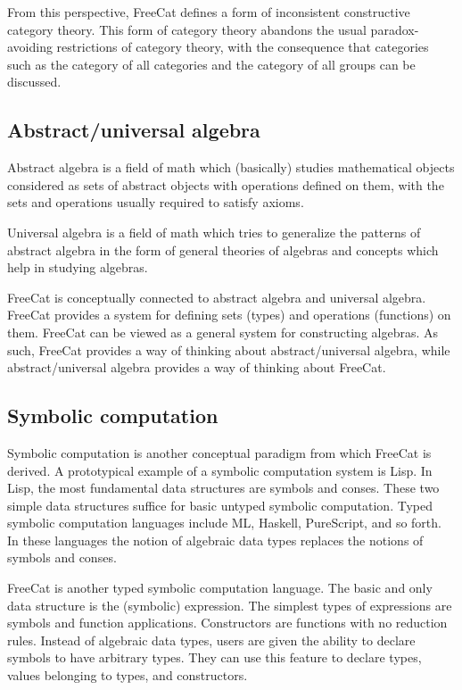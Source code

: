 \documentclass{article}
\begin{document}
From this perspective, FreeCat defines a form of inconsistent constructive category theory. This form of category theory abandons the usual paradox-avoiding restrictions of category theory, with the consequence that categories such as the category of all categories and the category of all groups can be discussed.

\subsection{Abstract/universal algebra}

Abstract algebra is a field of math which (basically) studies mathematical objects considered as sets of abstract objects with operations defined on them, with the sets and operations usually required to satisfy axioms.

Universal algebra is a field of math which tries to generalize the patterns of abstract algebra in the form of general theories of algebras and concepts which help in studying algebras.

FreeCat is conceptually connected to abstract algebra and universal algebra. FreeCat provides a system for defining sets (types) and operations (functions) on them. FreeCat can be viewed as a general system for constructing algebras. As such, FreeCat provides a way of thinking about abstract/universal algebra, while abstract/universal algebra provides a way of thinking about FreeCat.

\subsection{Symbolic computation}

Symbolic computation is another conceptual paradigm from which FreeCat is derived. A prototypical example of a symbolic computation system is Lisp. In Lisp, the most fundamental data structures are symbols and conses. These two simple data structures suffice for basic untyped symbolic computation. Typed symbolic computation languages include ML, Haskell, PureScript, and so forth. In these languages the notion of algebraic data types replaces the notions of symbols and conses.

FreeCat is another typed symbolic computation language. The basic and only data structure is the (symbolic) expression. The simplest types of expressions are symbols and function applications. Constructors are functions with no reduction rules. Instead of algebraic data types, users are given the ability to declare symbols to have arbitrary types. They can use this feature to declare types, values belonging to types, and constructors.
\end{document}
